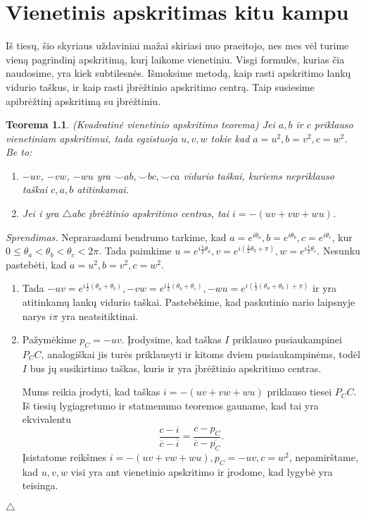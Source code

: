 \documentclass[11pt,a4paper,twoside]{book}
\def\leq{\leqslant}
\newenvironment{sprendimas}{\noindent \textit{Sprendimas.}}{\hfill $\triangle$}
\newtheorem{thmnr}{Teorema}
\theoremstyle{definition} \newtheorem*{api}{Apibrėžimas}
\theoremstyle{remark} \newtheorem*{pastaba}{Pastaba}
\begin{document}
\chapter{Vienetinis apskritimas kitu kampu}

Iš tiesų, šio skyriaus uždaviniai mažai skiriasi nuo praeitojo, nes mes vėl turime vieną pagrindinį apskritimą, kurį laikome vienetiniu. Visgi formulės, kurias čia naudosime, yra kiek subtilesnės. Išmoksime metodą, kaip rasti apskritimo lankų vidurio taškus, ir kaip rasti įbrėžtinio apskritimo centrą. Taip susiesime apibrėžtinį apskritimą su įbrėžtiniu.

\begin{thmnr} \textit{(Kvadratinė vienetinio apskritimo teorema)} Jei $a, b$ ir $c$ priklauso vienetiniam apskritimui, tada egzistuoja $u, v, w$ tokie kad $a=u^2, b=v^2, c=w^2$. Be to:\
\begin{enumerate}
\item $-uv$, $-vw$, $-wu$ yra $\smile ab, \smile bc, \smile ca$ vidurio taškai, kuriems nepriklauso taškai $c, a, b$ atitinkamai.
\item Jei i yra $\bigtriangleup$abc įbrėžtinio apskritimo centras, tai $i= - (uv + vw + wu)$.
\end{enumerate}
\end{thmnr}

\begin{sprendimas}
Neprarasdami bendrumo tarkime, kad $a=e^{i\theta_a}, b=e^{i\theta_b}, c=e^{i\theta_c}$, kur $0 \leq \theta_a < \theta_b < \theta_c < 2\pi$. Tada paimkime $u=e^{i\frac{1}{2}\theta_a}, v=e^{i(\frac{1}{2}\theta_b+\pi)}, w=e^{i\frac{1}{2}\theta_c}$. Nesunku pastebėti, kad $a=u^{2}, b=v^{2}, c=w^{2}$.

\begin{enumerate}
\item Tada $-uv=e^{i\frac{1}{2}(\theta_a+\theta_b)}, -vw=e^{i\frac{1}{2}(\theta_b+\theta_c)}, -wu=e^{i(\frac{1}{2}(\theta_a+\theta_b)+\pi)}$ ir yra atitinkamų lankų vidurio taškai. Pastebėkime, kad paskutinio nario laipsnyje narys $i\pi$ yra neatsitiktinai.
\item Pažymėkime $p_C=-uv$. Įrodysime, kad taškas $I$ priklauso pusiaukampinei $P_CC$, analogiškai jis turės priklausyti ir kitoms dviem pusiaukampinėms, todėl $I$ bus jų susikirtimo taškas, kuris ir yra įbrėžtinio apskritimo centras.

Mums reikia įrodyti, kad taškas $i=-(uv+vw+wu)$ priklauso tiesei $P_CC$. Iš tiesių lygiagretumo ir statmenumo teoremos gauname, kad tai yra ekvivalentu $$\frac{c-i}{\overline c - \overline i}=\frac{c-p_C}{\overline {c} - \overline {p_C}}.$$
Įsistatome reikšmes $i=-(uv+vw+wu), p_C=-uv, c=w^2$, nepamirštame, kad $u, v, w$ visi yra ant vienetinio apskritimo ir įrodome, kad lygybė yra teisinga.
\end{enumerate}
\end{sprendimas}
\end{document}
